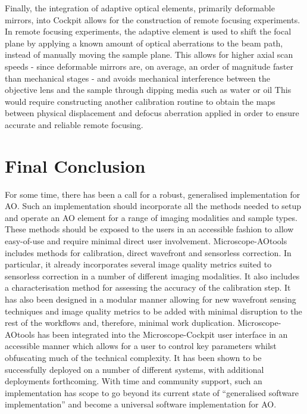 Finally, the integration of adaptive optical elements, primarily deformable 
mirrors, into Cockpit allows for the construction of remote focusing 
experiments. In remote focusing experiments, the adaptive element is used 
to shift the focal plane by applying a known amount of optical aberrations 
to the beam path, instead of manually moving the sample plane. This allows 
for higher axial scan speeds - since deformable mirrors are, on average, an 
order of magnitude faster than mechanical stages - and avoids mechanical 
interference between the objective lens and the sample through dipping 
media such as water or oil\cite{botcherby2008optical,vzurauskas2017rapid} 
This would require constructing another calibration routine to obtain the 
maps between physical displacement and defocus aberration applied in order 
to ensure accurate and reliable remote focusing.

\section{Final Conclusion}
\label{sec:final_conclusion}

For some time, there has been a call for a robust, generalised implementation 
for AO. Such an implementation should incorporate all the methods needed to
setup and operate an AO element for a range of imaging modalities and sample 
types. These methods should be exposed to the users in an accessible fashion 
to allow easy-of-use and require minimal direct user involvement. 
Microscope-AOtools includes methods for calibration, direct wavefront and 
sensorless correction. In particular, it already incorporates several image 
quality metrics suited to sensorless correction in a number of different 
imaging modalities. It also includes a characterisation method for assessing 
the accuracy of the calibration step. It has also been designed in a modular 
manner allowing for new wavefront sensing techniques and image quality 
metrics to be added with minimal disruption to the rest of the workflows and, 
therefore, minimal work duplication. Microscope-AOtools has been integrated 
into the Microscope-Cockpit user interface in an accessible manner which 
allows for a user to control key parameters whilst obfuscating much of the 
technical complexity. It has been shown to be successfully deployed on a 
number of different systems, with additional deployments forthcoming. With 
time and community support, such an implementation has scope to go beyond its 
current state of ``generalised software implementation'' and become a universal software implementation for AO.
